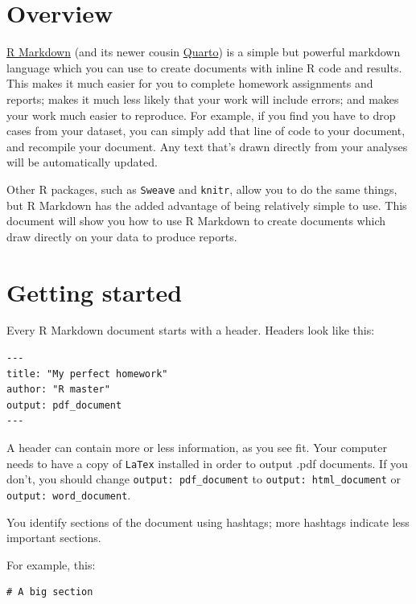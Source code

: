 \documentclass[
  letterpaper,
  DIV=11,
  numbers=noendperiod]{scrreprt}
\begin{document}
\hypertarget{overview-1}{%
\section{Overview}\label{overview-1}}

\href{https://bookdown.org/yihui/rmarkdown/}{R Markdown} (and its newer
cousin \href{https://quarto.org/}{Quarto}) is a simple but powerful
markdown language which you can use to create documents with inline R
code and results. This makes it much easier for you to complete homework
assignments and reports; makes it much less likely that your work will
include errors; and makes your work much easier to reproduce. For
example, if you find you have to drop cases from your dataset, you can
simply add that line of code to your document, and recompile your
document. Any text that's drawn directly from your analyses will be
automatically updated.

Other R packages, such as \texttt{Sweave} and \texttt{knitr}, allow you
to do the same things, but R Markdown has the added advantage of being
relatively simple to use. This document will show you how to use R
Markdown to create documents which draw directly on your data to produce
reports.

\hypertarget{getting-started}{%
\section{Getting started}\label{getting-started}}

Every R Markdown document starts with a header. Headers look like this:

\begin{verbatim}
---
title: "My perfect homework"
author: "R master"
output: pdf_document
---
\end{verbatim}

A header can contain more or less information, as you see fit. Your
computer needs to have a copy of \texttt{LaTex} installed in order to
output .pdf documents. If you don't, you should change
\texttt{output:\ pdf\_document} to \texttt{output:\ html\_document} or
\texttt{output:\ word\_document}.

You identify sections of the document using hashtags; more hashtags
indicate less important sections.

For example, this:

\begin{verbatim}
# A big section
\end{verbatim}
\end{document}
